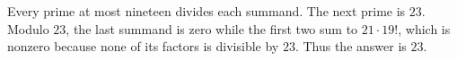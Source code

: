 Every prime at most nineteen divides each summand. The next prime is $23$. Modulo $23$, the last summand is zero while the first two sum to $21\cdot19!$, which is nonzero because none of its factors is divisible by $23$. Thus the answer is $\boxed{23}$.
